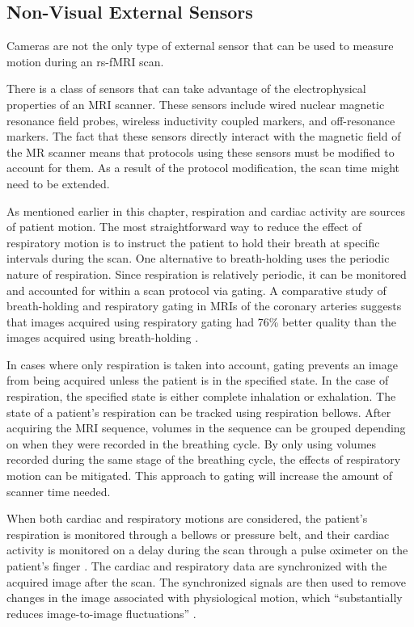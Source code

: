 \subsection{Non-Visual External Sensors}

Cameras are not the only type of external sensor that can be used to measure motion during an rs-fMRI scan. 

There is a class of sensors that can take advantage of the electrophysical properties of an MRI scanner. These sensors include wired nuclear magnetic resonance field probes, wireless inductivity coupled markers, and off-resonance markers. %
The fact that these sensors directly interact with the magnetic field of the MR scanner means that protocols using these sensors must be modified to account for them. As a result of the protocol modification, the scan time might need to be extended.

As mentioned earlier in this chapter, respiration and cardiac activity are sources of patient motion. The most straightforward way to reduce the effect of respiratory motion is to instruct the patient to hold their breath at specific intervals during the scan. One alternative to breath-holding uses the periodic nature of respiration. Since respiration is relatively periodic, it can be monitored and accounted for within a scan protocol via gating. A comparative study of breath-holding and respiratory gating in MRIs of the coronary arteries suggests that images acquired using respiratory gating had 76\% better quality than the images acquired using breath-holding \cite{PMID:7822549}.

In cases where only respiration is taken into account, gating prevents an image from being acquired unless the patient is in the specified state. In the case of respiration, the specified state is either complete inhalation or exhalation. The state of a patient's respiration can be tracked using respiration bellows. After acquiring the MRI sequence, volumes in the sequence can be grouped depending on when they were recorded in the breathing cycle. By only using volumes recorded during the same stage of the breathing cycle, the effects of respiratory motion can be mitigated. This approach to gating will increase the amount of scanner time needed.

When both cardiac and respiratory motions are considered, the patient's respiration is monitored through a bellows or pressure belt, and their cardiac activity is monitored on a delay during the scan through a pulse oximeter on the patient's finger \cite{Hu1995}. The cardiac and respiratory data are synchronized with the acquired image after the scan. The synchronized signals are then used to remove changes in the image associated with physiological motion, which ``substantially reduces image-to-image fluctuations'' \cite{Hu1995}.

